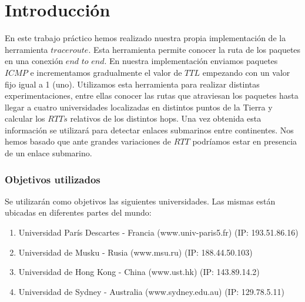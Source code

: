 \section{Introducción}

En este trabajo práctico hemos realizado nuestra propia implementación de la herramienta $traceroute$.
Esta herramienta permite conocer la ruta de los paquetes en una conexión $end$ $to$ $end$. 
En nuestra implementación enviamos paquetes $ICMP$ e incrementamos gradualmente el valor de $TTL$ empezando con un valor fijo igual a 1 (uno). 
Utilizamos esta herramienta para realizar distintas experimentaciones, entre ellas conocer las rutas que atraviesan los paquetes hasta 
llegar a cuatro universidades localizadas en distintos puntos de la Tierra y calcular los $RTTs$ relativos de los distintos hops.
Una vez obtenida esta información se utilizará para detectar enlaces submarinos entre continentes. Nos hemos basado que ante grandes variaciones
de $RTT$ podríamos estar en presencia de un enlace submarino.

\subsubsection{Objetivos utilizados}
Se utilizarán como objetivos las siguientes universidades. Las mismas están ubicadas en diferentes partes del mundo:
\begin{enumerate}
\item Universidad París Descartes - Francia (www.univ-paris5.fr) (IP: 193.51.86.16)
\item Universidad de Musku - Rusia (www.msu.ru) (IP: 188.44.50.103)
\item Universidad de Hong Kong - China (www.ust.hk) (IP: 143.89.14.2)
\item Universidad de Sydney - Australia (www.sydney.edu.au) (IP: 129.78.5.11)
\end{enumerate}


